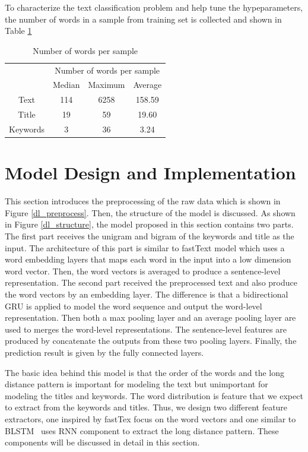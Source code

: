 To characterize the text classification problem and help tune the hypeparameters, the number of words in a sample from training set is collected and shown in Table \ref{num_words}


\begin{table}[]
\centering
\begin{tabular}{c|ccc}
\multirow{2}{*}{} & \multicolumn{3}{c}{Number of words per sample} \\
                  & Median        & Maximum        & Average       \\ \hline
Text              & 114           & 6258           & 158.59        \\
Title             & 19            & 59             & 19.60         \\
Keywords          & 3             & 36             & 3.24         
\end{tabular}
\caption{Number of words per sample}
\label{num_words}
\end{table}


\section{Model Design and Implementation}
This section introduces the preprocessing of the raw data which is shown in Figure \ref{dl_preprocess}. Then, the structure of the model is discussed. As shown in Figure \ref{dl_structure}, the model proposed in this section contains two parts. The first part receives the unigram and bigram of the keywords and title as the input. The architecture of this part is similar to fastText model which uses a word embedding layers that maps each word in the input into a low dimension word vector. Then, the word vectors is averaged to produce a sentence-level representation. The second part received the preprocessed text and also produce the word vectors by an embedding layer. The difference is that a bidirectional GRU is applied to model the word sequence and output the word-level representation. Then both a max pooling layer and an average pooling layer are used to merges the word-level representations. The sentence-level features are produced by concatenate the outputs from these two pooling layers. Finally, the prediction result is given by the fully connected layers.

The basic idea behind this model is that the order of the words and the long distance pattern is important for modeling the text but unimportant for modeling the titles and keywords. The word distribution is feature that we expect to extract from the keywords and titles. Thus, we design two different feature extractors, one inspired by fastTex focus on the word vectors and one similar to BLSTM~\cite{zhang2015relation} uses RNN component to extract the long distance pattern. These components will be discussed in detail in this section.


